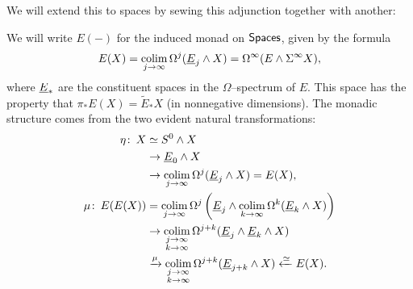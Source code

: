 We will extend this to spaces by sewing this adjunction together with another:
\begin{center}
\end{center}
We will write $E(-)$ for the induced monad on $\mathsf{Spaces}$, given by the formula \[E(X) = \operatorname*{colim}_{j \to \infty} \Omega^j (\underline{\smash{E}}_{j} \wedge X) = \Omega^\infty (E \wedge \Sigma^\infty X),\]  where $\underline{\smash{E}}_{*}$ are the constituent spaces in the $\Omega$--spectrum of $E$.  This space has the property that $\pi_* E(X) = \widetilde E_* X$ (in nonnegative dimensions).  The monadic structure comes from the two evident natural transformations:
\begin{align*}
\eta \colon\thinspace X & \simeq S^0 \wedge X \\
& \to \underline{\smash{E}}_{0} \wedge X \\
& \to \operatorname*{colim}_{j \to \infty} \Omega^j(\underline{\smash{E}}_{j} \wedge X) = E(X), \\
\mu \colon\thinspace E(E(X)) & = \operatorname*{colim}_{j \to \infty} \Omega^j \left( \underline{\smash{E}}_{j} \wedge \operatorname*{colim}_{k \to \infty} \Omega^k (\underline{\smash{E}}_{k} \wedge X) \right) \\
& \to \operatorname*{colim}_{\substack{j \to \infty \\ k \to \infty}} \Omega^{j+k} (\underline{\smash{E}}_{j} \wedge \underline{\smash{E}}_{k} \wedge X) \\
& \xrightarrow{\mu} \operatorname*{colim}_{\substack{j \to \infty \\ k \to \infty}} \Omega^{j+k} (\underline{\smash{E}}_{j+k} \wedge X) \xleftarrow{\simeq} E(X).
\end{align*}

